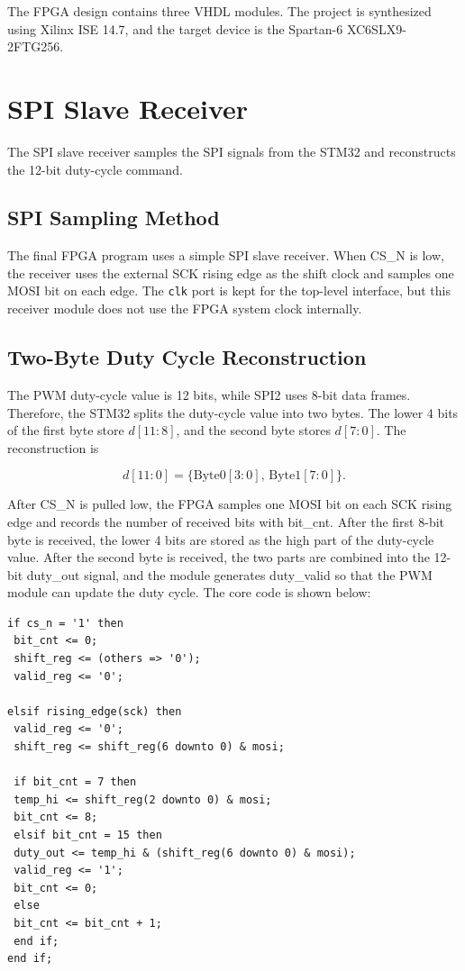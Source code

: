 \documentclass[12pt, a4paper]{report}
\begin{document}
The FPGA design contains three VHDL modules. The project is synthesized using Xilinx ISE 14.7, and the target device is the Spartan-6 XC6SLX9-2FTG256.


\section{SPI Slave Receiver}

The SPI slave receiver samples the SPI signals from the STM32 and reconstructs the 12-bit duty-cycle command.


\subsection{SPI Sampling Method}

The final FPGA program uses a simple SPI slave receiver. When CS\_N is low, the receiver uses the external SCK rising edge as the shift clock and samples one MOSI bit on each edge. The \texttt{clk} port is kept for the top-level interface, but this receiver module does not use the FPGA system clock internally. 

\subsection{Two-Byte Duty Cycle Reconstruction}

The PWM duty-cycle value is 12 bits, while SPI2 uses 8-bit data frames. Therefore, the STM32 splits the duty-cycle value into two bytes. The lower 4 bits of the first byte store \(d[11:8]\), and the second byte stores \(d[7:0]\). The reconstruction is

\[
d[11:0]=\{\text{Byte0}[3:0],\,\text{Byte1}[7:0]\}.
\]

After CS\_N is pulled low, the FPGA samples one MOSI bit on each SCK rising edge and records the number of received bits with bit\_cnt. After the first 8-bit byte is received, the lower 4 bits are stored as the high part of the duty-cycle value. After the second byte is received, the two parts are combined into the 12-bit duty\_out signal, and the module generates duty\_valid so that the PWM module can update the duty cycle. The core code is shown below:

\begin{lstlisting}[style=vhdlstyle,caption={SPI duty reconstruction}]
if cs_n = '1' then
 bit_cnt <= 0;
 shift_reg <= (others => '0');
 valid_reg <= '0';

elsif rising_edge(sck) then
 valid_reg <= '0';
 shift_reg <= shift_reg(6 downto 0) & mosi;

 if bit_cnt = 7 then
 temp_hi <= shift_reg(2 downto 0) & mosi;
 bit_cnt <= 8;
 elsif bit_cnt = 15 then
 duty_out <= temp_hi & (shift_reg(6 downto 0) & mosi);
 valid_reg <= '1';
 bit_cnt <= 0;
 else
 bit_cnt <= bit_cnt + 1;
 end if;
end if;
\end{lstlisting}
\end{document}
